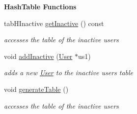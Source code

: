 \begin{Indent}\textbf{ Hash\+Table Functions}\par
\begin{DoxyCompactItemize}
\item 
tab\+H\+Inactive \hyperlink{class_agency_a6e06b2cf396c6d41ed4d5e2f215a3035}{get\+Inactive} () const
\begin{DoxyCompactList}\small\item\em accesses the table of the inactive users \end{DoxyCompactList}\item 
void \hyperlink{class_agency_aca43b6ff4d5b43aae73779cf271ac0fe}{add\+Inactive} (\hyperlink{class_user}{User} $\ast$us1)
\begin{DoxyCompactList}\small\item\em adds a new \hyperlink{class_user}{User} to the inactive users table \end{DoxyCompactList}\item 
\mbox{\label{class_agency_a4ef49242ff8030eddb766972f7555437}} 
void \hyperlink{class_agency_a4ef49242ff8030eddb766972f7555437}{generate\+Table} ()
\begin{DoxyCompactList}\small\item\em accesses the table of the inactive users \end{DoxyCompactList}\end{DoxyCompactItemize}
\end{Indent}
